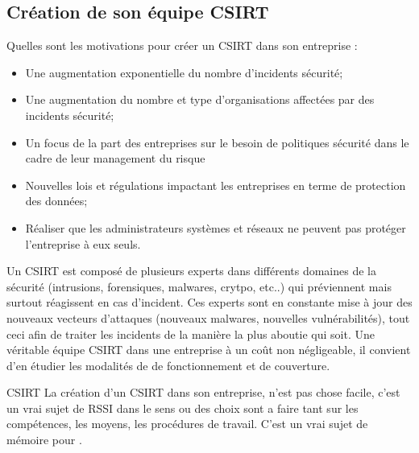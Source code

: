 \subsection{Création de son équipe CSIRT}

Quelles sont les motivations pour créer un CSIRT dans son entreprise : 

\begin{itemize}
  \item Une augmentation exponentielle du nombre d’incidents sécurité;
  \item Une augmentation du nombre et type d’organisations affectées par des incidents sécurité;
  \item Un focus de la part des entreprises sur le besoin de politiques sécurité dans le cadre de leur management du risque
  \item Nouvelles lois et régulations impactant les entreprises en terme de protection des données;
  \item Réaliser que les administrateurs systèmes et réseaux ne peuvent pas protéger l’entreprise à eux seuls.
\end{itemize}

Un CSIRT est composé de plusieurs experts dans différents domaines de la sécurité (intrusions, forensiques, malwares, crytpo, etc..) qui préviennent mais surtout réagissent en cas d’incident. Ces experts sont en constante mise à jour des nouveaux vecteurs d’attaques (nouveaux malwares, nouvelles vulnérabilités), tout ceci afin de traiter les incidents de la manière la plus aboutie qui soit. Une véritable équipe CSIRT dans une entreprise à un coût non négligeable, il convient d'en étudier les modalités de de fonctionnement et de couverture.


\begin{techworkbox}{CSIRT}
La création d'un CSIRT dans son entreprise, n'est pas chose facile, c'est un vrai sujet de RSSI dans le sens ou des choix sont a faire tant sur les compétences, les moyens, les procédures de travail. C'est un vrai sujet de mémoire pour \fichetech.
\end{techworkbox}
